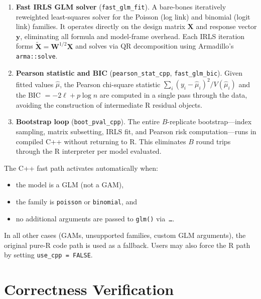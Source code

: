 \documentclass[11pt,a4paper]{article}
\begin{document}
\begin{enumerate}[leftmargin=*]
  \item \textbf{Fast IRLS GLM solver} (\texttt{fast\_glm\_fit}).
    A bare-bones iteratively reweighted least-squares solver for the Poisson
    (log link) and binomial (logit link) families.  It operates directly on the
    design matrix $\mathbf{X}$ and response vector $\mathbf{y}$, eliminating
    all formula and model-frame overhead.  Each IRLS iteration forms
    $\tilde{\mathbf{X}} = \mathbf{W}^{1/2}\mathbf{X}$ and solves via QR
    decomposition using Armadillo's \texttt{arma::solve}.

  \item \textbf{Pearson statistic and BIC} (\texttt{pearson\_stat\_cpp},
    \texttt{fast\_glm\_bic}).  Given fitted values $\hat{\mu}$, the Pearson
    chi-square statistic
    $\sum_i (y_i - \hat\mu_i)^2 / V(\hat\mu_i)$
    and the BIC $= -2\ell + p\log n$ are computed in a single pass through the
    data, avoiding the construction of intermediate R residual objects.

  \item \textbf{Bootstrap loop} (\texttt{boot\_pval\_cpp}).  The entire
    $B$-replicate bootstrap---index sampling, matrix subsetting, IRLS fit, and
    Pearson risk computation---runs in compiled C++ without returning to R.
    This eliminates $B$ round trips through the R interpreter per model
    evaluated.
\end{enumerate}

The C++ fast path activates automatically when:
\begin{itemize}
  \item the model is a GLM (not a GAM),
  \item the family is \texttt{poisson} or \texttt{binomial}, and
  \item no additional arguments are passed to \texttt{glm()} via~\texttt{\ldots}.
\end{itemize}
In all other cases (GAMs, unsupported families, custom GLM arguments), the
original pure-R code path is used as a fallback.  Users may also force the R
path by setting \texttt{use\_cpp = FALSE}.

\section{Correctness Verification}
\end{document}
